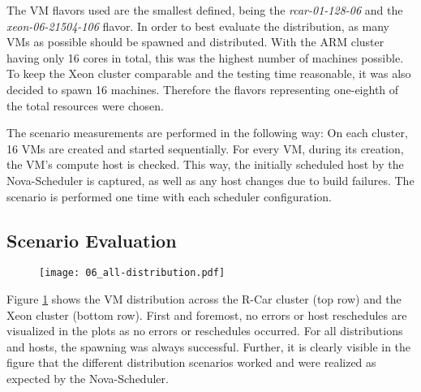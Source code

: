            \noindent The \ac{VM} flavors used are the smallest defined, being the \textsl{rcar-01-128-06} and the \textsl{xeon-06-21504-106} flavor.
            In order to best evaluate the distribution, as many \acp{VM} as possible should be spawned and distributed.
            With the ARM cluster having only 16 cores in total, this was the highest number of machines possible.
            To keep the Xeon cluster comparable and the testing time reasonable, it was also decided to spawn 16 machines.
            Therefore the flavors representing one-eighth of the total resources were chosen.
            
            \noindent The scenario measurements are performed in the following way:
            On each cluster, 16 \acp{VM} are created and started sequentially.
            For every \ac{VM}, during its creation, the \ac{VM}'s compute host is checked.
            This way, the initially scheduled host by the Nova-Scheduler is captured, as well as any host changes due to build failures.
            The scenario is performed one time with each scheduler configuration.
        
        
        \subsection{Scenario Evaluation}
            \begin{figure}[ht]
              \centering
              \texttt{[image: 06\_all-distribution.pdf]}
              \label{fig:vm_distribution}
            \end{figure}
            
            \noindent Figure \ref{fig:vm_distribution} shows the \ac{VM} distribution across the R-Car cluster (top row) and the Xeon cluster (bottom row).
            First and foremost, no errors or host reschedules are visualized in the plots as no errors or reschedules occurred.
            For all distributions and hosts, the spawning was always successful.
            Further, it is clearly visible in the figure that the different distribution scenarios worked and were realized as expected by the Nova-Scheduler.
            
